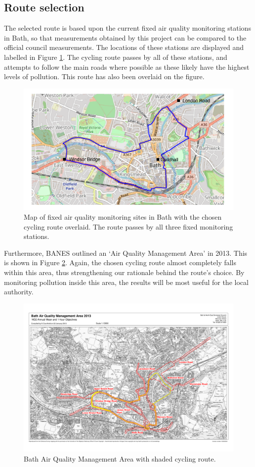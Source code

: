 \documentclass[11pt]{report}
\begin{document}
\subsection{Route selection} \label{route_selection}

The selected route is based upon the current fixed air quality monitoring stations in Bath, so that measurements obtained by this project can be compared to the official council measurements. The locations of these stations are displayed and labelled in Figure \ref{cycling_route}. The cycling route passes by all of these stations, and attempts to follow the main roads where possible as these likely have the highest levels of pollution. This route has also been overlaid on the figure.

\begin{figure}[!tb]
  \centering
  \includegraphics[width=0.7\linewidth]{cycling_route}
  \caption[Cycling route.]{Map of fixed air quality monitoring sites in Bath with the chosen cycling route overlaid. The route passes by all three fixed monitoring stations.}
  \label{cycling_route}
\end{figure}

Furthermore, BANES outlined an `Air Quality Management Area' in 2013. This is shown in Figure \ref{aqma}. Again, the chosen cycling route almost completely falls within this area, thus strengthening our rationale behind the route's choice. By monitoring pollution inside this area, the results will be most useful for the local authority.

\begin{figure}[!tb]
\centering
\includegraphics[width=1\textwidth]{shaded_route}
\caption[Bath Air Quality Management Area.]{Bath Air Quality Management Area \citep{BANES2017baqap} with shaded cycling route.}
\label{aqma}
\end{figure}
\end{document}
